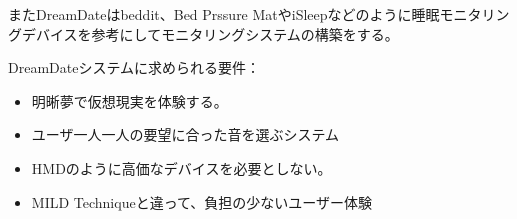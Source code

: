 またDreamDateはbeddit\cite{beddit}、Bed Prssure MatやiSleep\cite{iSleep}などのように睡眠モニタリングデバイスを参考にしてモニタリングシステムの構築をする。

DreamDateシステムに求められる要件：
\begin{itemize}
\item 明晰夢で仮想現実を体験する。
\item ユーザ一人一人の要望に合った音を選ぶシステム
\item HMDのように高価なデバイスを必要としない。
\item MILD Techniqueと違って、負担の少ないユーザー体験
\end{itemize}


　
　